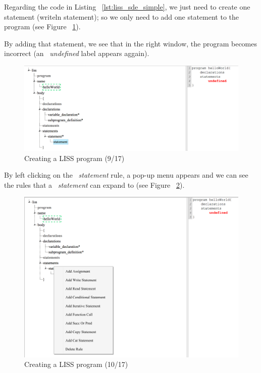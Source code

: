\documentclass[
  oneside,
  11pt, a4paper,
  footinclude=true,
  headinclude=true,
  cleardoublepage=empty
]{scrbook}
\begin{document}
Regarding the code in Listing ~\ref{lst:liss_sde_simple}, we just need to create one statement (writeln statement); so we only need to add one statement to the program (see Figure ~\ref{fig:LISS-SDE_example_9}).

By adding that statement, we see that in the right window, the program becomes incorrect (an ~\textit{undefined} label appears aggain).

\begin{figure}[h!]
  \centering
    \includegraphics[width=1\textwidth]{img/LISS-SDE_creating_program/LISS-SDE9.png}
    \caption{Creating a LISS program (9/17)}
    \label{fig:LISS-SDE_example_9}
\end{figure}

By left clicking on the ~\textit{statement} rule, a pop-up menu appears and we can see the rules that a ~\textit{statement} can expand to (see Figure ~\ref{fig:LISS-SDE_example_10}).

\begin{figure}[h!]
  \centering
    \includegraphics[width=1\textwidth]{img/LISS-SDE_creating_program/LISS-SDE10.png}
    \caption{Creating a LISS program (10/17)}
    \label{fig:LISS-SDE_example_10}
\end{figure}
\end{document}
